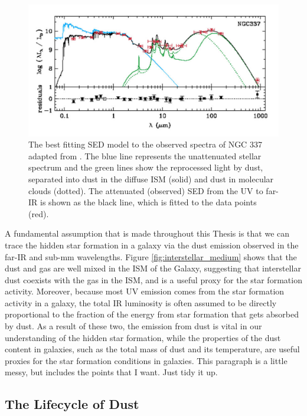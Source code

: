\begin{figure}
    \centering
	\includegraphics[width=0.9\columnwidth]{Figures/unattenuated_attenuated_sed.pdf}
	\caption[SED of NGC 337]{The best fitting SED model to the observed spectra of NGC 337 adapted from \citealt{daCunha_2008}. The blue line represents the unattenuated stellar spectrum and the green lines show the reprocessed light by dust, separated into dust in the diffuse ISM (solid) and dust in molecular clouds (dotted). The attenuated (observed) SED from the UV to far-IR is shown as the black line, which is fitted to the data points (red).}
	\label{fig:unattenuated_attenuated_sed}
\end{figure}

A fundamental assumption that is made throughout this Thesis is that we can trace the hidden star formation in a galaxy via the dust emission observed in the far-IR and sub-mm wavelengths. Figure \ref{fig:interstellar_medium} shows that the dust and gas are well mixed in the ISM of the Galaxy, suggesting that interstellar dust coexists with the gas in the ISM, and is a useful proxy for the star formation activity. Moreover, because most UV emission comes from the star formation activity in a galaxy, the total IR luminosity is often assumed to be directly proportional to the fraction of the energy from star formation that gets absorbed by dust. As a result of these two, the emission from dust is vital in our understanding of the hidden star formation, while the properties of the dust content in galaxies, such as the total mass of dust and its temperature, are useful proxies for the star formation conditions in galaxies.
{\color{red}This paragraph is a little messy, but includes the points that I want. Just tidy it up.}

\subsection{The Lifecycle of Dust}

